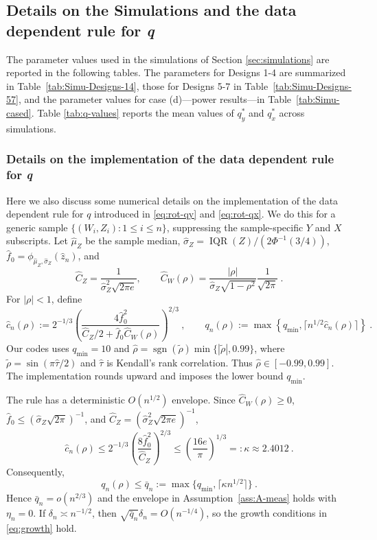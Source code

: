 \documentclass[11pt]{article}
\numberwithin{equation}{section}
\begin{document}
\subsection{Details on the Simulations and the data dependent rule for \emph{q}}\label{app:simulations}
The parameter values used in the simulations of Section \ref{sec:simulations} are reported in the following tables. The parameters for Designs 1-4 are summarized in Table~\ref{tab:Simu-Designs-14}, those for Designs 5-7 in Table~\ref{tab:Simu-Designs-57}, and the parameter values for case (d)---power results---in Table~\ref{tab:Simu-cased}. Table \ref{tab:q-values} reports the mean values of \(q_y^*\) and \(q_x^*\) across simulations.

\subsubsection{Details on the implementation of the data dependent rule for \emph{q}}

Here we also discuss some numerical details on the implementation of the data dependent rule for $q$ introduced in \eqref{eq:rot-qy} and \eqref{eq:rot-qx}. We do this for a generic sample $\{(W_i,Z_i):1\le i\le n\}$, suppressing the sample-specific $Y$ and $X$ subscripts. Let $\hat\mu_Z$ be the sample median, $\hat\sigma_Z=\operatorname{IQR}(Z)/(2\Phi^{-1}(3/4))$, $\hat f_0=\phi_{\hat\mu_Z,\hat\sigma_Z}(\hat z_n)$, and
\[
 \hat C_Z=\frac{1}{\hat\sigma_Z^2\sqrt{2\pi e}},\qquad
 \hat C_W(\rho)=\frac{|\rho|}{\hat\sigma_Z\sqrt{1-\rho^2}}\frac{1}{\sqrt{2\pi}}~.
\]
For $|\rho|<1$, define
\begin{equation}\label{eq:q_n_rho}
 \hat c_n(\rho) :=2^{-1/3}
 \left(\frac{4\hat f_0^2}{\hat C_Z/2+\hat f_0\hat C_W(\rho)}\right)^{2/3}~,
 \qquad
 q_n(\rho) :=\max\left\{q_{\min}, \lceil n^{1/2}\hat c_n(\rho)\rceil\right\}~.
\end{equation}
Our codes uses $q_{\min}=10$ and $\hat\rho=\operatorname{sgn}(\tilde\rho) \min\{|\tilde\rho|,0.99\}$, where $\tilde\rho=\sin(\pi\hat\tau/2)$ and $\hat\tau$ is Kendall's rank correlation. Thus $\hat\rho\in[-0.99,0.99]$. The implementation rounds upward and imposes the lower bound $q_{\min}$.

The rule has a deterministic $O(n^{1/2})$ envelope. Since $\hat C_W(\rho)\ge0$, $\hat f_0\le(\hat\sigma_Z\sqrt{2\pi})^{-1}$, and $\hat C_Z=(\hat\sigma_Z^2\sqrt{2\pi e})^{-1}$,
\[
 \hat c_n(\rho)
 \le 2^{-1/3}\left(\frac{8\hat f_0^2}{\hat C_Z}\right)^{2/3}
 \le \left(\frac{16e}{\pi}\right)^{1/3}
 =:\kappa\approx2.4012~.
\]
Consequently,
\begin{equation}\label{eq:q-rule-envelope}
 q_n(\rho)\le \bar q_n:=
 \max\{q_{\min},\lceil\kappa n^{1/2}\rceil\}~.
\end{equation}
Hence $\bar q_n=o(n^{2/3})$ and the envelope in Assumption~\ref{ass:A-meas} holds with $\eta_n=0$. If $\delta_n\asymp n^{-1/2}$, then $\sqrt{\bar q_n}\delta_n=O(n^{-1/4})$, so the growth conditions in \eqref{eq:growth} hold.
\end{document}
